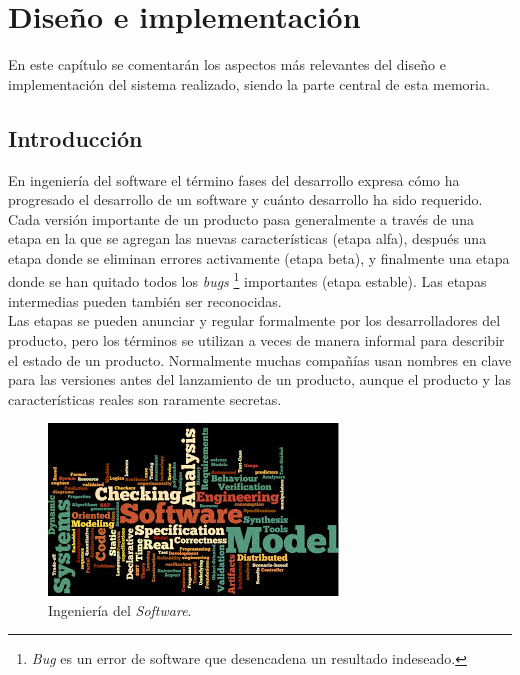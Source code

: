 \chapter{Dise\~no e implementaci\'on}\label{CAP:Disenoimplementacion}
En este cap\'itulo se comentar\'an los aspectos m\'as relevantes del dise\~no e implementaci\'on del sistema realizado, siendo la parte central de esta memoria.\\ 

\section{Introducci\'on}
En ingenier\'ia del software el t\'ermino fases del desarrollo expresa c\'omo ha progresado el desarrollo de un software y cu\'anto desarrollo ha sido requerido. Cada versi\'on importante de un producto pasa generalmente a trav\'es de una etapa en la que se agregan las nuevas caracter\'isticas (etapa alfa), despu\'es una etapa donde se eliminan errores activamente (etapa beta), y finalmente una etapa donde se han quitado todos los \textit{bugs} \footnote[1]{\textit{Bug} es un error de software que desencadena un resultado indeseado.} importantes (etapa estable). Las etapas intermedias pueden tambi\'en ser reconocidas.\\

Las etapas se pueden anunciar y regular formalmente por los desarrolladores del producto, pero los t\'erminos se utilizan a veces de manera informal para describir el estado de un producto. Normalmente muchas compa\~n\'ias usan nombres en clave para las versiones antes del lanzamiento de un producto, aunque el producto y las caracter\'isticas reales son raramente secretas.\\

\begin{figure}[htbp]
	
	\centering
	\includegraphics[scale=0.5]{./Figuras/ingenieriadelsw.jpg}
	\caption{Ingenier\'ia del \textit{Software}.}
	\label{fig:ingSW}
	
\end{figure}

